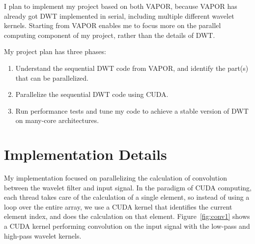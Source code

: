 \documentclass{article}
\begin{document}
I plan to implement my project based on both VAPOR, because 
VAPOR has already got DWT implemented in serial, 
including multiple different wavelet kernels.
%
Starting from VAPOR enables me to focus more on the parallel computing 
component of my project, rather than the details of DWT.

%

%
%
%

My project plan has three phases:
\begin{enumerate}
\item Understand the sequential DWT code from VAPOR, 
and identify the part(s) that can be parallelized.
%
\item Parallelize the sequential DWT code using CUDA.
%
\item Run performance tests and tune my code to achieve a stable version
of DWT on many-core architectures.
\end{enumerate}


\section{Implementation Details}
\label{sec:implementation}
%
My implementation focused on parallelizing the calculation of convolution 
between the wavelet filter and input signal.
%
In the paradigm of CUDA computing, each thread takes care of the
calculation of a single element, so instead of using a loop over the entire
array, we use a CUDA kernel that identifies the current element index,
and does the calculation on that element.
%
Figure~\ref{fig:conv1} shows a CUDA kernel performing convolution on the
input signal with the low-pass and high-pass wavelet kernels.
\end{document}
